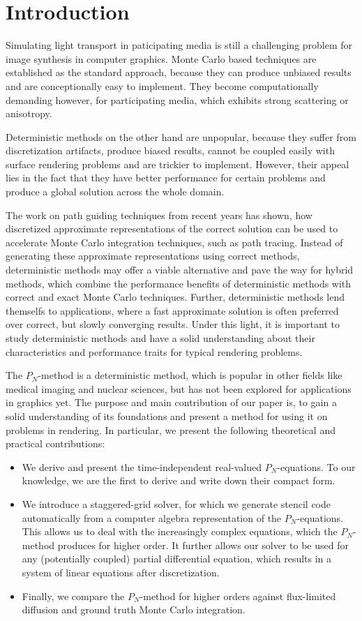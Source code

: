 \section{Introduction}

Simulating light transport in paticipating media is still a challenging problem for image synthesis in computer graphics. Monte Carlo based techniques are established as the standard approach, because they can produce unbiased results and are conceptionally easy to implement. They become computationally demanding however, for participating media, which exhibits strong scattering or anisotropy.

Deterministic methods on the other hand are unpopular, because they suffer from discretization artifacts, produce biased results, cannot be coupled easily with surface rendering problems and are trickier to implement. However, their appeal lies in the fact that they have better performance for certain problems and produce a global solution across the whole domain.

The work on path guiding techniques from recent years has shown, how discretized approximate representations of the correct solution can be used to accelerate Monte Carlo integration techniques, such as path tracing. Instead of generating these approximate representations using correct methods, deterministic methods may offer a viable alternative and pave the way for hybrid methods, which combine the performance benefits of deterministic methods with correct and exact Monte Carlo techniques. Further, deterministic methods lend themselfs to applications, where a fast approximate solution is often preferred over correct, but slowly converging results. Under this light, it is important to study deterministic methods and have a solid understanding about their characteristics and performance traits for typical rendering problems.

The $P_N$-method is a deterministic method, which is popular in other fields like medical imaging and nuclear sciences, but has not been explored for applications in graphics yet. The purpose and main contribution of our paper is, to gain a solid understanding of its foundations and present a method for using it on problems in rendering. In particular, we present the following theoretical and practical contributions:
\begin{itemize}
	\item We derive and present the time-independent real-valued $P_N$-equations. To our knowledge, we are the first to derive and write down their compact form.
	\item We introduce a staggered-grid solver, for which we generate stencil code automatically from a computer algebra representation of the $P_N$-equations. This allows us to deal with the increasingly complex equations, which the $P_N$-method produces for higher order. It further allows our solver to be used for any (potentially coupled) partial differential equation, which results in a system of linear equations after discretization.
	\item Finally, we compare the $P_N$-method for higher orders against flux-limited diffusion and ground truth Monte Carlo integration.
\end{itemize}

